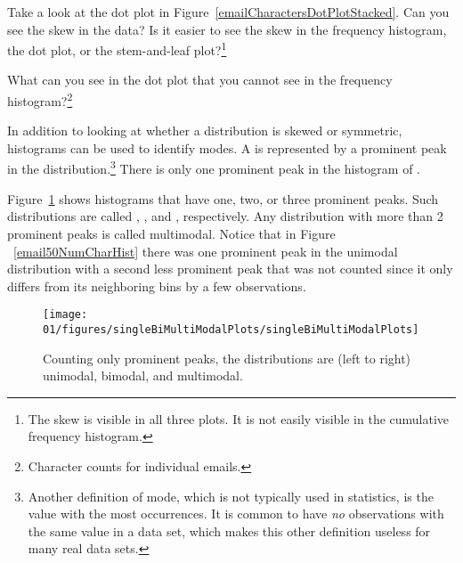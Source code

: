 
\begin{exercise}
Take a look at the dot plot in Figure~\ref{emailCharactersDotPlotStacked}. Can you see the skew in the data? Is it easier to see the skew in the frequency histogram, the dot plot, or the stem-and-leaf plot?\footnote{The skew is visible in all three plots.  It is not easily visible in the cumulative frequency histogram.}
\end{exercise}

\begin{exercise}
What can you see in the dot plot  that you cannot see in the frequency histogram?\footnote{Character counts for individual emails.}
\end{exercise}

In addition to looking at whether a distribution is skewed or symmetric, histograms can be used to identify modes. A  is represented by a prominent peak in the distribution.\footnote{Another definition of mode, which is not typically used in statistics, is the value with the most occurrences. It is common to have \emph{no} observations with the same value in a data set, which makes this other definition useless for many real data sets.} There is only one prominent peak in the histogram of .

Figure~\ref{singleBiMultiModalPlots} shows histograms that have one, two, or three prominent peaks. Such distributions are called , , and , respectively. Any distribution with more than 2 prominent peaks is called multimodal. Notice that in Figure ~\ref{email50NumCharHist} there was one prominent peak in the unimodal distribution with a second less prominent peak that was not counted since it only differs from its neighboring bins by a few observations.

\begin{figure}[h]
   \centering
   \texttt{[image: 01/figures/singleBiMultiModalPlots/singleBiMultiModalPlots]}
   \caption{Counting only prominent peaks, the distributions are (left to right) unimodal, bimodal, and multimodal.}
   \label{singleBiMultiModalPlots}
\end{figure}


